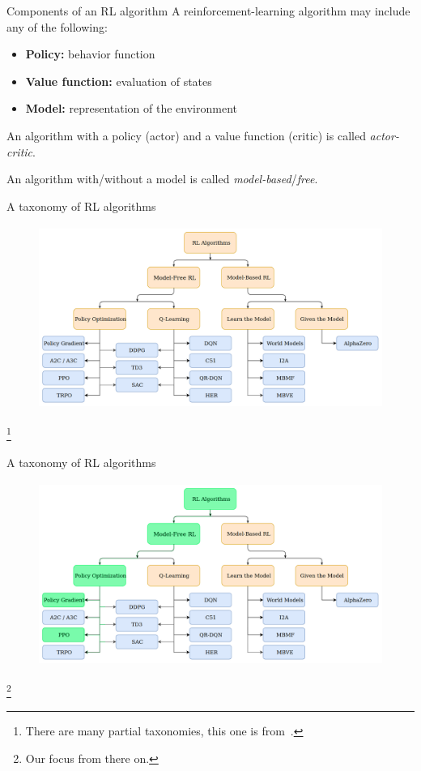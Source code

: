 \documentclass[10pt, aspectratio=1610]{beamer}
\newcommand\blfootnote[1]{%
  \begingroup
  \renewcommand\thefootnote{}%
  \footnote{#1}%
  \addtocounter{footnote}{-1}%
  \endgroup
}
\begin{document}
\begin{frame}{Components of an RL algorithm}
    A reinforcement-learning algorithm may include any of the following:
    \begin{itemize}
        \item \textbf{Policy:} behavior function
        \item \textbf{Value function:} evaluation of states
        \item \textbf{Model:} representation of the environment
    \end{itemize}
    An algorithm with a policy (actor) and a value function (critic) is called \emph{actor-critic}.

    An algorithm with/without a model is called \emph{model-based}/\emph{free}.
\end{frame}

\begin{frame}{A taxonomy of RL algorithms}
    \begin{figure}
        \includegraphics[height=6cm]{figures/taxonomy.png}
    \end{figure}
    \blfootnote{
        There are many partial taxonomies, this one is from~\cite{spinningup}.
    }
\end{frame}

\begin{frame}{A taxonomy of RL algorithms}
    \begin{figure}
        \includegraphics[height=6cm]{figures/taxonomy-focus.png}
    \end{figure}
    \blfootnote{
        Our focus from there on.
    }
\end{frame}
\end{document}

